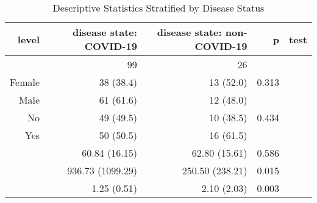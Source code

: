 \begin{table}[ht]
\centering
\begin{tabular}{rrrrr}
  \hline
level & disease state: COVID-19 & disease state: non-COVID-19 & p & test \\ 
  \hline
 & 99 & 26 &  &  \\ 
  Female & 38 (38.4) & 13 (52.0) & 0.313 &  \\ 
  Male & 61 (61.6) & 12 (48.0) &  &  \\ 
  No & 49 (49.5) & 10 (38.5) & 0.434 &  \\ 
  Yes & 50 (50.5) & 16 (61.5) &  &  \\ 
   & 60.84 (16.15) & 62.80 (15.61) & 0.586 &  \\ 
   & 936.73 (1099.29) & 250.50 (238.21) & 0.015 &  \\ 
   & 1.25 (0.51) & 2.10 (2.03) & 0.003 &  \\ 
   \hline
\end{tabular}
\caption{Descriptive Statistics Stratified by Disease Status} 
\label{tab:descriptive_stats}
\end{table}

